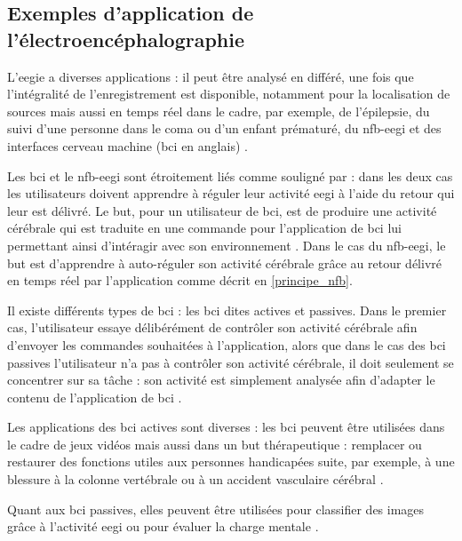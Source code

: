 \subsection{Exemples d'application de l'électroencéphalographie}

L'\gls{eegie} a diverses applications : il peut être analysé en différé, une fois que l'intégralité de l'enregistrement est disponible, notamment pour la localisation de sources \citep{Latif2006} 
mais aussi en temps réel dans le cadre, par exemple, de l'épilepsie, du suivi d'une personne dans 
le coma ou d'un enfant prématuré, du \gls{nfb}-\gls{eegi} et des interfaces cerveau machine (\gls{bci} en anglais) \citep{Li2010}. 

Les \gls{bci} et le \gls{nfb}-\gls{eegi} sont étroitement liés comme souligné par \citet{Jeunet2018} : dans les deux cas les utilisateurs doivent apprendre à réguler leur activité \gls{eegi} à l'aide du retour 
qui leur est délivré. Le but, pour un utilisateur de \gls{bci}, est de produire une activité cérébrale qui est traduite en une commande pour l'application de \gls{bci} lui permettant ainsi d'intéragir 
avec son environnement \citep{Enriquez2017, Birbaumer2009}. Dans le cas du \gls{nfb}-\gls{eegi}, le but est d'apprendre à auto-réguler son activité cérébrale grâce au retour délivré en temps réel par l'application 
\citep{Enriquez2017, Jeunet2018} comme décrit en \ref{principe_nfb}.

Il existe différents types de \gls{bci} : les \gls{bci} dites actives et passives. Dans le premier cas, l'utilisateur essaye délibérément de contrôler son activité cérébrale afin
d'envoyer les commandes souhaitées à l'application, alors que dans le cas des \gls{bci} passives l'utilisateur n'a pas à contrôler son activité cérébrale, il doit seulement
se concentrer sur sa tâche : son activité est simplement analysée afin d'adapter le contenu de l'application de \gls{bci} \citep{George2014}. 

Les applications des \gls{bci} actives sont diverses : les \gls{bci} peuvent être utilisées dans le cadre de jeux vidéos \citep{Kerous2018} mais aussi dans un but thérapeutique : remplacer ou
restaurer des fonctions utiles aux personnes handicapées suite, par exemple, à une blessure à la colonne vertébrale ou à un accident vasculaire cérébral \citep{Shih2012}. 

Quant aux \gls{bci} passives, elles peuvent être utilisées pour classifier des images grâce à l'activité \gls{eegi} ou pour évaluer la charge mentale \citep{George2014}.   

